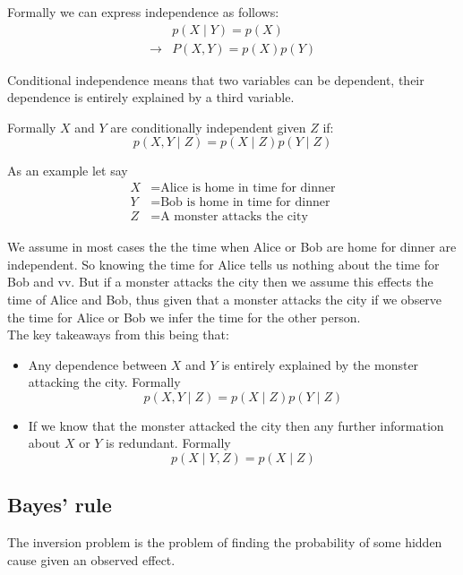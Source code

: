 \documentclass[12pt]{article}
\begin{document}
Formally we can express independence as follows:
\begin{align*}
    & p(X\mid Y) = p(X) \\
    \rightarrow & P(X, Y)  = p(X)p(Y)
\end{align*}

\begin{definition}    
    Conditional independence means that two variables can be dependent,  their dependence is entirely explained by a third variable. 
\end{definition}

Formally $X$ and $Y$ are conditionally independent given $Z$ if:
\[
    p(X, Y\mid Z) = p(X\mid Z)p(Y\mid Z)  
\]

As an example let say 
\begin{align*}
    X & = \text{Alice is home in time for dinner} \\
    Y & = \text{Bob is home in time for dinner} \\
    Z & = \text{A monster attacks the city}
\end{align*}

We assume in most cases the the time when Alice or Bob are home for dinner are independent. So knowing the time for Alice tells us nothing about the time for Bob and vv. But if a monster attacks the city then we assume this effects the time of  Alice and Bob, thus given that a monster attacks the city if we observe the time for Alice or Bob we  infer the time for the other person. \\ 
The key takeaways from this being that: 
\begin{itemize}
    \item Any dependence between $X$ and $Y$ is entirely explained by the monster attacking the city. Formally 
    \[
        p(X, Y\mid Z) = p(X\mid Z)p(Y\mid Z)
    \]
    \item If we know that the monster attacked the city then any further information about $X$ or $Y$ is redundant. Formally 
    \[
        p(X\mid Y, Z) = p(X\mid Z)
    \]
\end{itemize}

\subsection{Bayes' rule}

\begin{definition}
    The inversion problem is the problem of finding the probability of some hidden cause given an observed effect. 
\end{definition}
\end{document}
